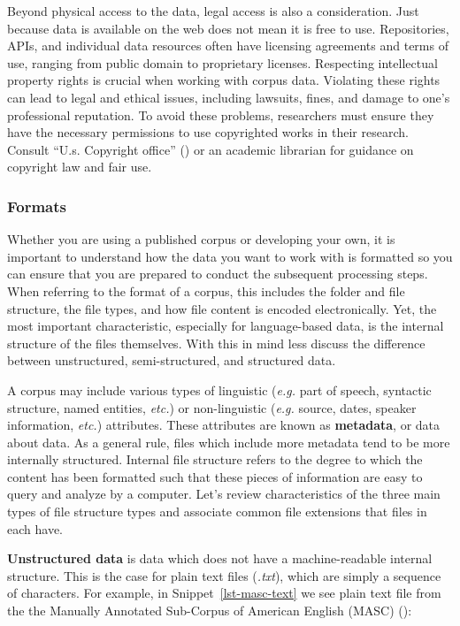 \documentclass[
  letterpaper,
]{latex/krantz}
\theoremstyle{definition}
\theoremstyle{remark}
\begin{document}
Beyond physical access to the data, legal access is also a
consideration. Just because data is available on the web does not mean
it is free to use. Repositories, APIs, and individual data resources
often have licensing agreements and terms of use, ranging from public
domain to proprietary licenses. Respecting intellectual property rights
is crucial when working with corpus data. Violating these rights can
lead to legal and ethical issues, including lawsuits, fines, and damage
to one's professional reputation. To avoid these problems, researchers
must ensure they have the necessary permissions to use copyrighted works
in their research. Consult {``U.s. Copyright office''}
() or an academic librarian for
guidance on copyright law and fair use.

\subsubsection{Formats}\label{formats}

Whether you are using a published corpus or developing your own, it is
important to understand how the data you want to work with is formatted
so you can ensure that you are prepared to conduct the subsequent
processing steps. When referring to the format of a corpus, this
includes the folder and file structure, the file types, and how file
content is encoded electronically. Yet, the most important
characteristic, especially for language-based data, is the internal
structure of the files themselves. With this in mind less discuss the
difference between unstructured, semi-structured, and structured data.

A corpus may include various types of linguistic (\emph{e.g.} part of
speech, syntactic structure, named entities, \emph{etc.}) or
non-linguistic (\emph{e.g.} source, dates, speaker information,
\emph{etc.}) attributes. These attributes are known as
\textbf{metadata}, or data about data. As a general rule, files which
include more metadata tend to be more internally structured. Internal
file structure refers to the degree to which the content has been
formatted such that these pieces of information are easy to query and
analyze by a computer. Let's review characteristics of the three main
types of file structure types and associate common file extensions that
files in each have.

\textbf{Unstructured data} is data which does not have a
machine-readable internal structure. This is the case for plain text
files (\emph{.txt}), which are simply a sequence of characters. For
example, in Snippet~\ref{lst-masc-text} we see plain text file from the
the Manually Annotated Sub-Corpus of American English (MASC)
():
\end{document}
